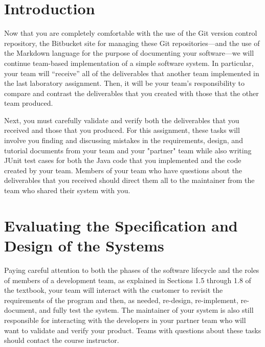 

\usepackage[compact]{titlesec}



\vspace*{-.1in}
\section*{Introduction}

Now that you are completely comfortable with the use of the Git version control repository, the Bitbucket site for managing
these Git repositories---and the use of the Markdown language for the purpose of documenting your software---we will
continue team-based implementation of a simple software system. In particular, your team will ``receive'' all of the
deliverables that another team implemented in the last laboratory assignment. Then, it will be your team's
responsibility to compare and contrast the deliverables that you created with those that the other team produced.

Next, you must carefully validate and verify both the deliverables that you received and those that you produced. For
this assignment, these tasks will involve you finding and discussing mistakes in the requirements, design, and tutorial
documents from your team and your "partner" team while also writing JUnit test cases for both the Java code that you
implemented and the code created by your team. Members of your team who have questions about the deliverables that you
received should direct them all to the maintainer from the team who shared their system with you.

\section*{Evaluating the Specification and Design of the Systems}

Paying careful attention to both the phases of the software lifecycle and the roles of members of a development team, as
explained in Sections 1.5 through 1.8 of the textbook, your team will interact with the customer to revisit the
requirements of the program and then, as needed, re-design, re-implement, re-document, and fully test the system.  The
maintainer of your system is also still responsible for interacting with the developers in your partner team who will
want to validate and verify your product. Teams with questions about these tasks should contact the course instructor.

